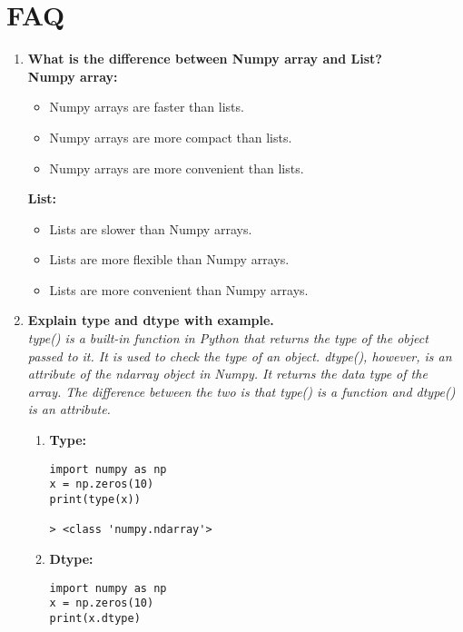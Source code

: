 \documentclass[11pt]{article}
\begin{document}
\section{FAQ}
\begin{enumerate}
    \item \textbf{What is the difference between Numpy array and List?}\\
    
          \textbf{Numpy array:}\\
          \begin{itemize}
              \item Numpy arrays are faster than lists.
              \item Numpy arrays are more compact than lists.
              \item Numpy arrays are more convenient than lists.
          \end{itemize}

          \textbf{List:}\\
          \begin{itemize}
              \item Lists are slower than Numpy arrays.
              \item Lists are more flexible than Numpy arrays.
              \item Lists are more convenient than Numpy arrays.
          \end{itemize}

    \item \textbf{Explain type and dtype with example.}\\
    
          \textit{type() is a built-in function in Python that returns the type of the object passed to it. It is used to check the type of an object. dtype(), however, is an attribute of the ndarray object in Numpy. It returns the data type of the array. The difference between the two is that type() is a function and dtype() is an attribute.}

          \begin{enumerate}
              \item \textbf{Type:}
                    \begin{verbatim}
import numpy as np
x = np.zeros(10)
print(type(x))

> <class 'numpy.ndarray'>
                \end{verbatim}

              \item \textbf{Dtype:}
                    \begin{verbatim}
import numpy as np
x = np.zeros(10)
print(x.dtype)


\end{verbatim}
\end{enumerate}
\end{enumerate}
\end{document}
